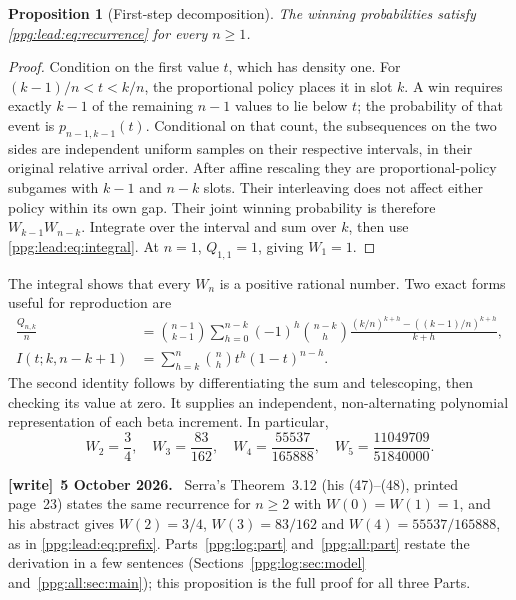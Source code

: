 \documentclass[11pt,letterpaper]{article}
\newtheorem{proposition}[theorem]{Proposition}
\theoremstyle{remark}\newtheorem{remark}[theorem]{Remark}
\numberwithin{equation}{section}
\newenvironment{writenote}[1][]{\par\smallskip\begingroup\small
 \noindent\textbf{[write]}\if\relax\detokenize{#1}\relax\else~\textbf{#1.}\fi\ }%
 {\par\endgroup\smallskip}
\begin{document}
\begin{proposition}[First-step decomposition]\label{ppg:lead:prop:recurrence}
The winning probabilities satisfy \eqref{ppg:lead:eq:recurrence} for every $n\ge1$.
\end{proposition}
\begin{proof}
Condition on the first value $t$, which has density one. For
$(k-1)/n<t<k/n$, the proportional policy places it in slot $k$. A win requires exactly $k-1$ of the remaining $n-1$ values to lie below $t$; the probability of that event is $p_{n-1,k-1}(t)$. Conditional on that count, the subsequences on the two sides are independent uniform samples on their respective intervals, in their original relative arrival order. After affine rescaling they are proportional-policy subgames with $k-1$ and $n-k$ slots. Their interleaving does not affect either policy within its own gap. Their joint winning probability is therefore $W_{k-1}W_{n-k}$. Integrate over the interval and sum over $k$, then use \eqref{ppg:lead:eq:integral}. At $n=1$, $Q_{1,1}=1$, giving $W_1=1$.
\end{proof}

The integral shows that every $W_n$ is a positive rational number. Two exact forms useful for reproduction are
\begin{align}
 \frac{Q_{n,k}}n
 &=\binom{n-1}{k-1}\sum_{h=0}^{n-k}(-1)^h\binom{n-k}{h}
 \frac{(k/n)^{k+h}-((k-1)/n)^{k+h}}{k+h},\label{ppg:lead:eq:poly}\\
 I(t;k,n-k+1)&=\sum_{h=k}^n\binom nh t^h(1-t)^{n-h}.\label{ppg:lead:eq:tail}
\end{align}
The second identity follows by differentiating the sum and telescoping, then checking its value at zero. It supplies an independent, non-alternating polynomial representation of each beta increment. In particular,
\begin{equation}\label{ppg:lead:eq:prefix}
 W_2=\frac34,\quad W_3=\frac{83}{162},\quad
 W_4=\frac{55537}{165888},\quad W_5=\frac{11049709}{51840000}.
\end{equation}
\begin{writenote}[5 October 2026]
Serra's Theorem~3.12 (his (47)--(48), printed page~23) states the same recurrence for $n\ge2$ with $W(0)=W(1)=1$, and his abstract gives $W(2)=3/4$, $W(3)=83/162$ and $W(4)=55537/165888$, as in \eqref{ppg:lead:eq:prefix}. Parts~\ref{ppg:log:part} and~\ref{ppg:all:part} restate the derivation in a few sentences (Sections~\ref{ppg:log:sec:model} and~\ref{ppg:all:sec:main}); this proposition is the full proof for all three Parts.
\end{writenote}
\end{document}
